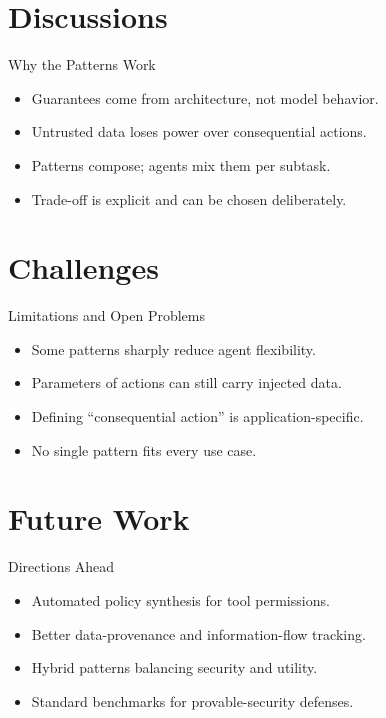 \documentclass{beamer}
\begin{document}
\section{Discussions}
\begin{frame}{Why the Patterns Work}
\begin{itemize}
\item Guarantees come from architecture, not model behavior.
\item Untrusted data loses power over consequential actions.
\item Patterns compose; agents mix them per subtask.
\item Trade-off is explicit and can be chosen deliberately.
\end{itemize}
\end{frame}

\section{Challenges}
\begin{frame}{Limitations and Open Problems}
\begin{itemize}
\item Some patterns sharply reduce agent flexibility.
\item Parameters of actions can still carry injected data.
\item Defining ``consequential action'' is application-specific.
\item No single pattern fits every use case.
\end{itemize}
\end{frame}

\section{Future Work}
\begin{frame}{Directions Ahead}
\begin{itemize}
\item Automated policy synthesis for tool permissions.
\item Better data-provenance and information-flow tracking.
\item Hybrid patterns balancing security and utility.
\item Standard benchmarks for provable-security defenses.
\end{itemize}
\end{frame}
\end{document}
